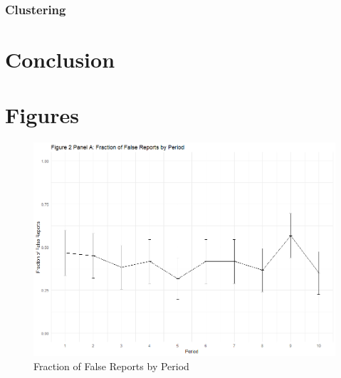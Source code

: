 \documentclass[12pt,a4paper]{article}
\begin{document}
	
	\subsubsection{Clustering}
	
	
	\section{Conclusion}
	
	
	
	
	\newpage
	
	
	
	\newpage
	\section{Figures}
	
	\begin{figure}
		\centering
		\includegraphics[scale=0.4]{../../results/2a_rep.png}
		\caption{Fraction of False Reports by Period} \label{tab:R1}
		\label{fig:enter-label}
	\end{figure}
	
\end{document}
